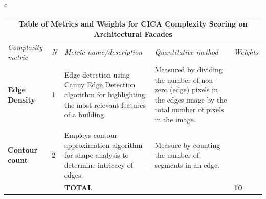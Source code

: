 \begin{linenumbers}
\begin{table}[!htb]
\begin{tabular}{c}
\begin{minipage}{\textwidth}
\label{tab:MetricsandWeights}
\begin{tabularx}{\textwidth}{p{2.5cm} p{1cm} X X >{\centering\arraybackslash}p{1cm}}
\toprule
\multicolumn{5}{c}{\textbf{Table of Metrics and Weights for CICA Complexity Scoring on Architectural Facades}} \\
\toprule
\textit{Complexity metric} & \textit{N} & \textit{Metric name/description} & \textit{Quantitative   method} & \textit{Weights} \\ \midrule
\textbf{Edge Density} &
1 &
Edge detection using Canny Edge Detection algorithm for highlighting the most relevant features of a building.& Measured by dividing the number of non-zero (edge) pixels in the edges image by the total number of pixels in the image.&
8\\
\\
\textbf{Contour count} &
2 &
Employs contour approximation algorithm for shape analysis to determine intricacy of edges.
&
Measure by counting the number of segments in an edge.
&
2\\ \bottomrule
&
&
\textbf{TOTAL} &
&
\textbf{10}\\ \bottomrule
\end{tabularx}
\end{minipage}
\\
\begin{minipage}{\textwidth}
\centering
{}
\label{tab:CICAImageEvalProcessOnArchitecturalFacades}

\end{minipage}

\end{tabular}
\end{table}


\end{linenumbers}
